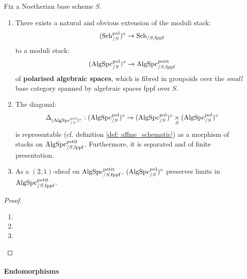                     \begin{proposition} \label{prop: geometric_properties_of_moduli_stacks_of_polarised_schemes}
                        Fix a Noetherian base scheme $S$. 
                            \begin{enumerate}
                                \item There exists a natural and obvious extension of the moduli stack:
                                    $$(\mathrm{Sch}_{/S}^{\mathrm{pol}})^{\circ} \to \mathrm{Sch}_{/S, \mathrm{fppf}}$$
                                to a moduli stack:
                                    $$(\mathrm{Alg}\mathrm{Spc}_{/S}^{\mathrm{pol}})^{\circ} \to \mathrm{Alg}\mathrm{Spc}_{/S, \mathrm{fppf}}^{\mathrm{petit}}$$
                                of \textbf{polarised algebraic spaces}, which is fibred in groupoids over the \textit{small} base category spanned by algebraic spaces fppf over $S$.
                                \item The diagonal:
                                    $$\Delta_{(\Alg\Spc_{/S}^{\pol})^{\circ}}: (\Alg\Spc_{/S}^{\pol})^{\circ}\to (\Alg\Spc_{/S}^{\pol})^{\circ} \x_S (\Alg\Spc_{/S}^{\pol})^{\circ}$$
                                is representable (cf. definition \ref{def: affine_schematic}) as a morphism of stacks on $\mathrm{Alg}\mathrm{Spc}_{/S, \mathrm{fppf}}^{\mathrm{petit}}$. Furthermore, it is separated and of finite presentation.
                                \item As a $(2, 1)$-sheaf on $\mathrm{Alg}\mathrm{Spc}_{/S, \mathrm{fppf}}^{\mathrm{petit}}$, $(\mathrm{Alg}\mathrm{Spc}_{/S}^{\mathrm{pol}})^{\circ}$ preserves limits in $\mathrm{Alg}\mathrm{Spc}_{/S, \mathrm{fppf}}^{\mathrm{petit}}$. 
                            \end{enumerate}
                    \end{proposition}
                        \begin{proof}
                            \noindent
                            \begin{enumerate}
                                \item 
                                \item 
                                \item 
                            \end{enumerate}
                        \end{proof}
                
                \paragraph{Endomorphisms}
                
